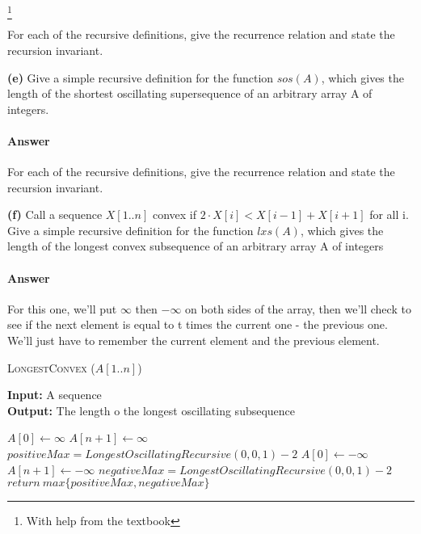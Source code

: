 \documentclass{article}
\begin{document}
\footnote{With help from the textbook}





\todo{}



For each of the recursive definitions, give the recurrence
relation and state the recursion invariant.

{\bf (e)} Give a simple recursive definition for the function $sos(A)$, which gives
the length of the shortest oscillating supersequence of an arbitrary array
A of integers.

\paragraph{Answer}

\todo{}



For each of the recursive definitions, give the recurrence
relation and state the recursion invariant.

{\bf (f)} Call a sequence $X[1.. n]$ convex if $2 \cdot X[i] < X[i-1] + X[i+1]$ for all i.
Give a simple recursive definition for the function $lxs(A)$, which gives
the length of the longest convex subsequence of an arbitrary array A of
integers

\paragraph{Answer}

For this one, we'll put $\infty$ then $-\infty$ on both sides of the array, then we'll check to see
if the next element is equal to t times the current one - the previous one. We'll just have to
remember the current element and the previous element.

\begin{algorithm} \caption{\textsc{LongestConvex} ($A[1..n]$)}\label{alg:seb}
    {\bf Input:} A sequence\\
    {\bf Output:} The length o the longest oscillating subsequence
    \begin{algorithmic}[1]
        \State$A[0] \gets \infty$
        \State$A[n+1] \gets \infty$
        \State$positiveMax = LongestOscillatingRecursive(0, 0, 1) -2$
        \State$A[0] \gets -\infty$
        \State$A[n+1] \gets -\infty$
        \State$negativeMax = LongestOscillatingRecursive(0, 0, 1) -2$
        \State$return\ max\{positiveMax, negativeMax\}$
    \end{algorithmic}
\end{algorithm}
\end{document}
